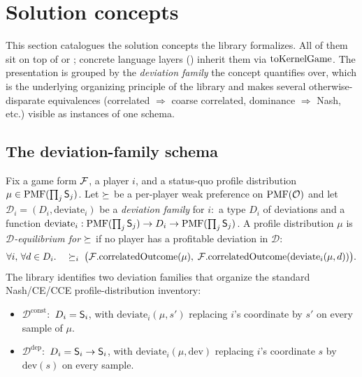 \section{Solution concepts}
\label{sec:solution-concepts}

This section catalogues the solution concepts the library
formalizes.  All of them sit on top of  or
; concrete language layers ()
inherit them via $\mathrm{toKernelGame}$.  The presentation is grouped by the
\emph{deviation family} the concept quantifies over, which is the
underlying organizing principle of the library and makes
several otherwise-disparate equivalences (correlated $\Rightarrow$
coarse correlated, dominance $\Rightarrow$ Nash, etc.) visible as
instances of one schema.

\subsection{The deviation-family schema}
\label{sec:solution-concepts:family}

Fix a game form $\mathcal{F}$, a player $i$, and a status-quo profile
distribution $\mu \in \mathrm{PMF}(\prod_j \mathsf{S}_j)$.  Let
$\succeq$ be a per-player weak preference on $\mathrm{PMF}(\mathcal{O})$ and
let $\mathcal{D}_i = (D_i, \mathrm{deviate}_i)$ be a
\emph{deviation family} for $i$:\ a type $D_i$ of deviations and a
function $\mathrm{deviate}_i : \mathrm{PMF}(\prod_j \mathsf{S}_j) \to D_i \to
\mathrm{PMF}(\prod_j \mathsf{S}_j)$.  A profile distribution $\mu$ is
\emph{$\mathcal{D}$-equilibrium for $\succeq$} if no player has a
profitable deviation in $\mathcal{D}$:
\begin{equation}
\label{eq:devschema}
  \forall i,\, \forall d \in D_i.\quad
    \succeq_i\;\bigl(\mathcal{F}.\mathrm{correlatedOutcome}(\mu),\;
                   \mathcal{F}.\mathrm{correlatedOutcome}(\mathrm{deviate}_i(\mu, d))\bigr).
\end{equation}
The library identifies two deviation families that organize the
standard Nash/CE/CCE profile-distribution inventory:

\begin{itemize}\itemsep2pt
\item $\mathcal{D}^{\mathrm{const}}$:\ $D_i = \mathsf{S}_i$, with
$\mathrm{deviate}_i(\mu, s')$ replacing $i$'s coordinate by $s'$
on every sample of $\mu$.

\item $\mathcal{D}^{\mathrm{dep}}$:\ $D_i = \mathsf{S}_i \to \mathsf{S}_i$,
with $\mathrm{deviate}_i(\mu, \mathrm{dev})$ replacing $i$'s
coordinate $s$ by $\mathrm{dev}(s)$ on every sample.
\end{itemize}

